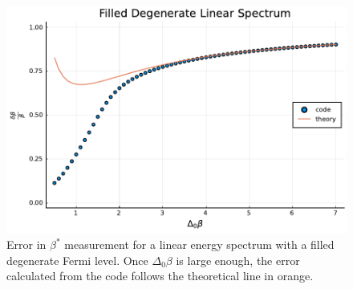 \begin{figure}[H]
    \centering
    \includegraphics[scale=0.75]{figures/pdf/linE_filldegen_g0-2_N10.pdf}
    \caption{Error in $\beta^*$ measurement for a linear energy spectrum with a filled degenerate Fermi level. Once $\Delta_0\beta$ is large enough, the error calculated from the code follows the theoretical line in orange.}
    \label{fig:Filled}
\end{figure}

